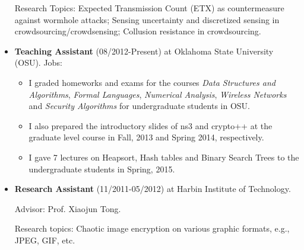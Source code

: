 \documentclass{article}
\begin{document}
\begin{itemize}
Research Topics: Expected Transmission Count (ETX) as countermeasure against wormhole attacks; Sensing uncertainty and discretized sensing in crowdsourcing/crowdsensing; Collusion resistance in crowdsourcing.
%
%
\item {\bf Teaching Assistant} (08/2012-Present) at Oklahoma State University (OSU).
Jobs: 
	\begin{itemize}
	\item I graded homeworks and exams for the courses {\it Data Structures and Algorithms}, {\it Formal Languages}, {\it Numerical Analysis}, {\it Wireless Networks} and {\it Security Algorithms} for undergraduate students in OSU. 
	\item I also prepared the introductory slides of ns3 and crypto++ at the graduate level course in Fall, 2013 and Spring 2014, respectively.
	\item I gave 7 lectures on Heapsort, Hash tables and Binary Search Trees to the undergraduate students in Spring, 2015.
	\end{itemize}

\item {\bf Research Assistant} (11/2011-05/2012) at Harbin Institute of Technology.

Advisor: Prof. Xiaojun Tong.

Research topics: Chaotic image encryption on various graphic formats, e.g., JPEG, GIF, etc.
\end{itemize}
\end{document}
